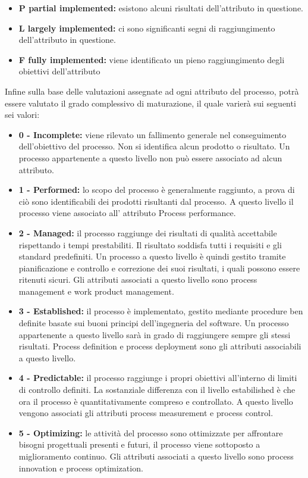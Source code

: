 \documentclass[11pt,a4paper]{article}
\begin{document}
{\begin{itemize}
	\item \textbf{P partial implemented:} esistono alcuni risultati dell'attributo in questione.
	\item \textbf{L largely implemented:} ci sono significanti segni di raggiungimento dell'attributo in questione.
	\item \textbf{F fully implemented:} viene identificato un pieno raggiungimento degli obiettivi dell'attributo
	\end{itemize}
	Infine sulla base delle valutazioni assegnate ad ogni attributo del processo, potrà essere valutato il grado complessivo di maturazione, il quale varierà sui seguenti sei valori:
	\begin{itemize}
	\item \textbf{0 - Incomplete:} viene rilevato un fallimento generale nel conseguimento dell'obiettivo del processo. Non si identifica alcun prodotto o risultato. Un processo appartenente a questo livello non può essere associato ad alcun attributo.
	\item \textbf{1 - Performed:} lo scopo del processo è generalmente raggiunto, a prova di ciò sono identificabili dei prodotti risultanti dal processo. A questo livello il processo viene associato all' attributo Process performance.
	\item \textbf{2 - Managed:} il processo raggiunge dei risultati di qualità accettabile rispettando i tempi prestabiliti. Il risultato soddisfa tutti i requisiti e gli standard predefiniti. Un processo a questo livello è quindi gestito tramite pianificazione e controllo e correzione dei suoi risultati, i quali possono essere ritenuti sicuri. Gli attributi associati a questo livello sono process management e work product management.
	\item \textbf{3 - Established:} il processo è implementato, gestito mediante procedure ben definite basate sui buoni principi dell'ingegneria del software. Un processo appartenente a questo livello sarà in grado di raggiungere sempre gli stessi risultati. Process definition e process deployment sono gli attributi associabili a questo livello.
	\item \textbf{4 - Predictable:} il processo raggiunge i propri obiettivi all'interno di limiti di controllo definiti. La sostanziale differenza con il livello estabilished è che ora il processo è quantitativamente compreso e controllato. A questo livello vengono associati gli attributi process measurement e process control.
	\item \textbf{5 - Optimizing:} le attività del processo sono ottimizzate per affrontare bisogni progettuali presenti e futuri, il processo viene sottoposto a miglioramento continuo. Gli attributi associati a questo livello sono process innovation e process optimization.

\end{itemize}}
\end{document}
